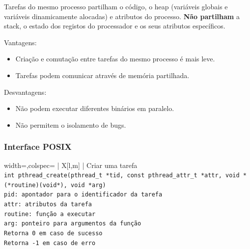 \documentclass[11pt]{article}
\begin{document}
Tarefas do mesmo processo partilham o código, o heap (variáveis globais e variáveis dinamicamente alocadas) e atributos do processo. \textbf{Não partilham} a stack, o estado dos registos do processador e os seus atributos específicos.

Vantagens:
\begin{itemize}
    \item Criação e comutação entre tarefas do mesmo processo é mais leve.
    \item Tarefas podem comunicar através de memória partilhada.
\end{itemize}

Desvantagens:
\begin{itemize}
    \item Não podem executar diferentes binários em paralelo.
    \item Não permitem o isolamento de bugs.
\end{itemize}

\subsubsection{Interface POSIX}

\begin{tblr}{width=\linewidth,colspec={ | X[l,m] | }}
    \hline
    \centering Criar uma tarefa                                                                                    \\\hline
    \lstinline|int pthread_create(pthread_t *tid, const pthread_attr_t *attr, void *(*routine)(void*), void *arg)| \\\hline
    \lstinline|pid: apontador para o identificador da tarefa|                                                      \\
    \lstinline|attr: atributos da tarefa|                                                                          \\
    \lstinline|routine: função a executar|                                                                         \\
    \lstinline|arg: ponteiro para argumentos da função|                                                            \\\hline
    \lstinline|Retorna 0 em caso de sucesso|                                                                       \\
    \lstinline|Retorna -1 em caso de erro|                                                                         \\\hline
\end{tblr}
\end{document}
